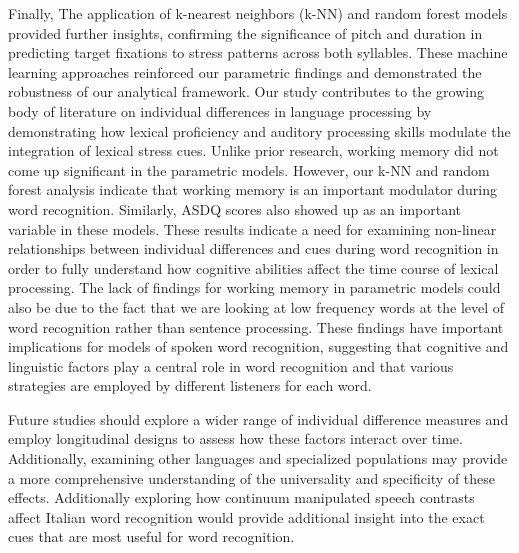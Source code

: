 Finally, The application of k-nearest neighbors (k-NN) and random forest models provided further insights, confirming the significance of pitch and duration in predicting target fixations to stress patterns across both syllables. These machine learning approaches reinforced our parametric findings and demonstrated the robustness of our analytical framework. Our study contributes to the growing body of literature on individual differences in language processing by demonstrating how lexical proficiency and auditory processing skills modulate the integration of lexical stress cues. Unlike prior research, working memory did not come up significant in the parametric models. However, our k-NN and random forest analysis indicate that working memory is an important modulator during word recognition. Similarly, ASDQ scores also showed up as an important variable in these models. These results indicate a need for examining non-linear relationships between individual differences and cues during word recognition in order to fully understand how cognitive abilities affect the time course of lexical processing. The lack of findings for working memory in parametric models could also be due to the fact that we are looking at low frequency words at the level of word recognition rather than sentence processing. These findings have important implications for models of spoken word recognition, suggesting that cognitive and linguistic factors play a central role in word recognition and that various strategies are employed by different listeners for each word.

Future studies should explore a wider range of individual difference measures and employ longitudinal designs to assess how these factors interact over time. Additionally, examining other languages and specialized populations may provide a more comprehensive understanding of the universality and specificity of these effects. Additionally exploring how continuum manipulated speech contrasts affect Italian word recognition would provide additional insight into the exact cues that are most useful for word recognition.